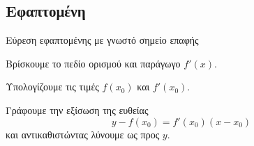 \subsection{Εφαπτομένη}
\begin{askhsh}{Εύρεση εφαπτομένης με γνωστό σημείο επαφής}
\bhmata\begin{bhma}
\item Βρίσκουμε το πεδίο ορισμού και παράγωγο $ f'(x) $.
\item Υπολογίζουμε τις τιμές $ f(x_0) $ και $ f'(x_0) $.
\item Γράφουμε την εξίσωση της ευθείας
\[ y-f(x_0)=f'(x_0)(x-x_0) \]
και αντικαθιστώντας λύνουμε ως προς $ y $.
\end{bhma}
\end{askhsh}

